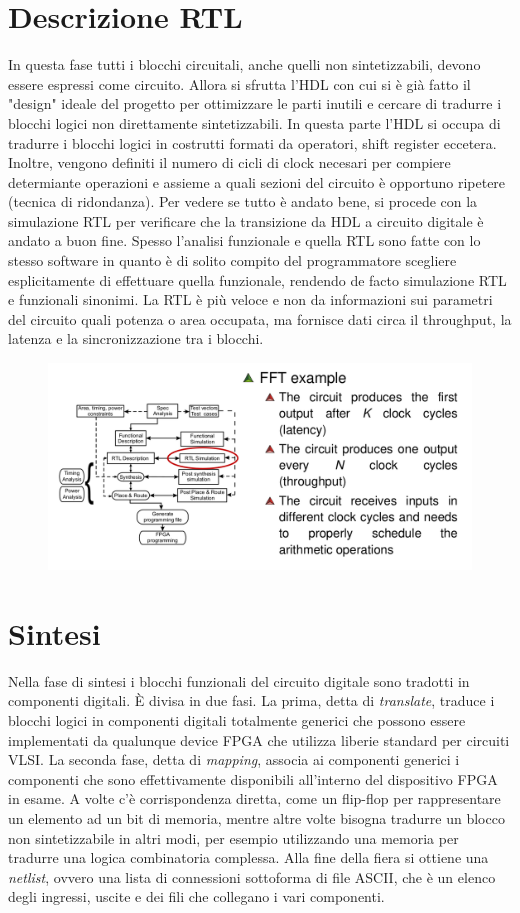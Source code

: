 \documentclass{book}
\begin{document}
\section{Descrizione RTL}
    In questa fase tutti i blocchi circuitali, anche quelli non sintetizzabili, devono essere espressi come circuito. Allora si sfrutta l'HDL con cui si è già fatto il "design" ideale del progetto per ottimizzare le parti inutili e cercare di tradurre i blocchi logici non direttamente sintetizzabili. In questa parte l'HDL si occupa di tradurre i blocchi logici in costrutti formati da operatori, shift register eccetera. Inoltre, vengono definiti il numero di cicli di clock necesari per compiere determiante operazioni e assieme a quali sezioni del circuito è opportuno ripetere (tecnica di ridondanza). Per vedere se tutto è andato bene, si procede con la simulazione RTL per verificare che la transizione da HDL a circuito digitale è andato a buon fine. Spesso l'analisi funzionale e quella RTL sono fatte con lo stesso software in quanto è di solito compito del programmatore scegliere esplicitamente di effettuare quella funzionale, rendendo de facto simulazione RTL e funzionali sinonimi. La RTL è più veloce e non da informazioni sui parametri del circuito quali potenza o area occupata, ma fornisce dati circa il throughput, la latenza e la sincronizzazione tra i blocchi.
    \begin{figure}[h!]
        \centering
        \includegraphics[width=0.95\linewidth]{img/chapt3img3.png}
    \end{figure}
\section{Sintesi}
    Nella fase di sintesi i blocchi funzionali del circuito digitale sono tradotti in componenti digitali. È divisa in due fasi. La prima, detta di \textit{translate}, traduce i blocchi logici in componenti digitali totalmente generici che possono essere implementati da qualunque device FPGA che utilizza liberie standard per circuiti VLSI. La seconda fase, detta di \textit{mapping}, associa ai componenti generici i componenti che sono effettivamente disponibili all'interno del dispositivo FPGA in esame. A volte c'è corrispondenza diretta, come un flip-flop per rappresentare un elemento ad un bit di memoria, mentre altre volte bisogna tradurre un blocco non sintetizzabile in altri modi, per esempio utilizzando una memoria per tradurre una logica combinatoria complessa. Alla fine della fiera si ottiene una \textit{netlist}, ovvero una lista di connessioni sottoforma di file ASCII, che è un elenco degli ingressi, uscite e dei fili che collegano i vari componenti.
\end{document}
